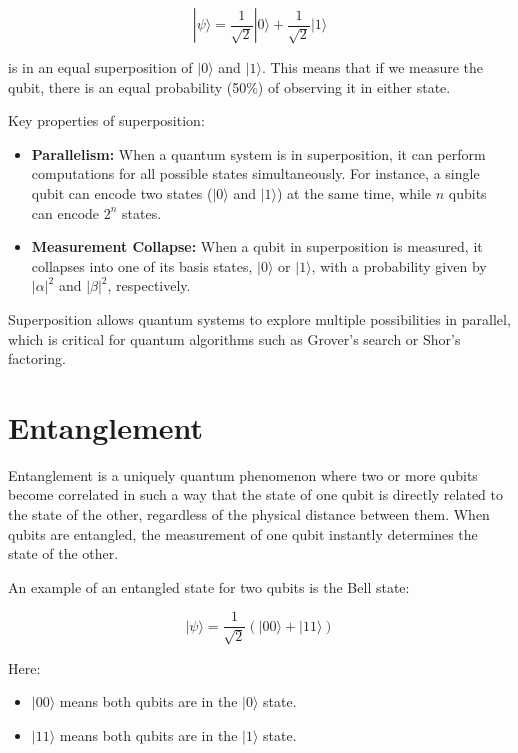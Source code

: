 \documentclass[11pt]{article}
\theoremstyle{definition}
\begin{document}
\begin{equation}
|\psi\rangle = \frac{1}{\sqrt{2}}|0\rangle + \frac{1}{\sqrt{2}}|1\rangle
\end{equation}

is in an equal superposition of $|0\rangle$ and $|1\rangle$. This means that if we measure the qubit, there is an equal probability (50\%) of observing it in either state.

Key properties of superposition:
\begin{itemize}
    \item \textbf{Parallelism:} When a quantum system is in superposition, it can perform computations for all possible states simultaneously. For instance, a single qubit can encode two states ($|0\rangle$ and $|1\rangle$) at the same time, while $n$ qubits can encode $2^n$ states.
    \item \textbf{Measurement Collapse:} When a qubit in superposition is measured, it collapses into one of its basis states, $|0\rangle$ or $|1\rangle$, with a probability given by $|\alpha|^2$ and $|\beta|^2$, respectively.
\end{itemize}

Superposition allows quantum systems to explore multiple possibilities in parallel, which is critical for quantum algorithms such as Grover's search or Shor's factoring.

\section*{Entanglement}
Entanglement is a uniquely quantum phenomenon where two or more qubits become correlated in such a way that the state of one qubit is directly related to the state of the other, regardless of the physical distance between them. When qubits are entangled, the measurement of one qubit instantly determines the state of the other.

An example of an entangled state for two qubits is the Bell state:

\begin{equation}
|\psi\rangle = \frac{1}{\sqrt{2}} (|00\rangle + |11\rangle)
\end{equation}

Here:
\begin{itemize}
    \item $|00\rangle$ means both qubits are in the $|0\rangle$ state.
    \item $|11\rangle$ means both qubits are in the $|1\rangle$ state.
\end{itemize}
\end{document}
